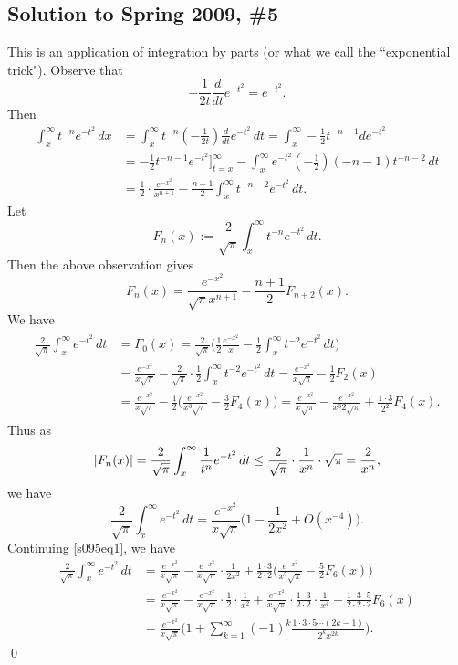 \subsection*{Solution to Spring 2009, \#5}\label{s095}
This is an application of integration by parts (or what we call the ``exponential trick").
Observe that
$$-\frac{1}{2t}\frac{d}{dt}e^{-t^{2}} = e^{-t^{2}}.$$
Then
\begin{align*}
\int_{x}^{\infty}t^{-n}e^{-t^{2}}\, dx &= \int_{x}^{\infty}t^{-n}(-\frac{1}{2t})\frac{d}{dt}e^{-t^{2}}\, dt= \int_{x}^{\infty}-\frac{1}{2}t^{-n-1}de^{-t^{2}}\\
&= -\frac{1}{2}t^{-n-1}e^{-t^{2}}\bigg]_{t = x}^{\infty} - \int_{x}^{\infty}e^{-t^{2}}(-\frac{1}{2})(-n-1)t^{-n-2}\, dt\\
&= \frac{1}{2}\cdot \frac{e^{-x^{2}}}{x^{n + 1}} - \frac{n + 1}{2}\int_{x}^{\infty}t^{-n-2}e^{-t^{2}}\, dt.
\end{align*}
Let $$F_{n}(x) := \frac{2}{\sqrt{\pi}}\int_{x}^{\infty}t^{-n}e^{-t^{2}}\, dt.$$ Then the above observation gives
$$F_{n}(x) = \frac{e^{-x^{2}}}{\sqrt{\pi}x^{n + 1}} - \frac{n + 1}{2}F_{n + 2}(x).$$
We have
\begin{align}\label{s095eq1}
\begin{aligned}
\frac{2}{\sqrt{\pi}}\int_{x}^{\infty}e^{-t^{2}}\, dt &= F_{0}(x) = \frac{2}{\sqrt{\pi}}\bigg(\frac{1}{2}\frac{e^{-x^{2}}}{x} - \frac{1}{2}\int_{x}^{\infty}t^{-2}e^{-t^{2}}\, dt\bigg)\\
&= \frac{e^{-x^{2}}}{x\sqrt{\pi}} - \frac{2}{\sqrt{\pi}}\cdot \frac{1}{2}\int_{x}^{\infty}t^{-2}e^{-t^{2}}\, dt = \frac{e^{-x^{2}}}{x\sqrt{\pi}} - \frac{1}{2}F_{2}(x)\\
&= \frac{e^{-x^{2}}}{x\sqrt{\pi}} - \frac{1}{2}\bigg(\frac{e^{-x^{2}}}{x^{3}\sqrt{\pi}} - \frac{3}{2}F_{4}(x)\bigg) = \frac{e^{-x^{2}}}{x\sqrt{\pi}} - \frac{e^{-x^{2}}}{x^{3}2\sqrt{\pi}} + \frac{1 \cdot 3}{2^{2}}F_{4}(x).
\end{aligned}
\end{align}
Thus as
$$|F_{n}(x)| = \frac{2}{\sqrt{\pi}}\int_{x}^{\infty}\frac{1}{t^{n}}e^{-t^{2}}\, dt \leq \frac{2}{\sqrt{\pi}}\cdot \frac{1}{x^{n}}\cdot \sqrt{\pi} = \frac{2}{x^{n}},$$
we have
$$\frac{2}{\sqrt{\pi}}\int_{x}^{\infty}e^{-t^{2}}\, dt = \frac{e^{-x^{2}}}{x\sqrt{\pi}}\bigg(1 - \frac{1}{2x^{2}} + O(x^{-4})\bigg).$$
Continuing \eqref{s095eq1}, we have
\begin{align*}
\frac{2}{\sqrt{\pi}}\int_{x}^{\infty}e^{-t^{2}}\, dt &= \frac{e^{-x^{2}}}{x\sqrt{\pi}} - \frac{e^{-x^{2}}}{x\sqrt{\pi}}\cdot \frac{1}{2x^{2}} + \frac{1\cdot 3}{2 \cdot 2}\bigg(\frac{e^{-x^{2}}}{x^{5}\sqrt{\pi}} - \frac{5}{2}F_{6}(x)\bigg)\\
& = \frac{e^{-x^{2}}}{x\sqrt{\pi}} - \frac{e^{-x^{2}}}{x\sqrt{\pi}}\cdot \frac{1}{2}\cdot \frac{1}{x^{2}} + \frac{e^{-x^{2}}}{x\sqrt{\pi}}\cdot \frac{1 \cdot 3}{2 \cdot 2} \cdot \frac{1}{x^{4}} - \frac{1 \cdot 3 \cdot 5}{2 \cdot 2 \cdot 2}F_{6}(x)\\
&= \frac{e^{-x^{2}}}{x\sqrt{\pi}}\bigg(1 + \sum_{k = 1}^{\infty}(-1)^{k}\frac{1 \cdot 3 \cdot 5 \cdots (2k - 1)}{2^{k}x^{2k}}\bigg).
\end{align*}
\hfill\qed

